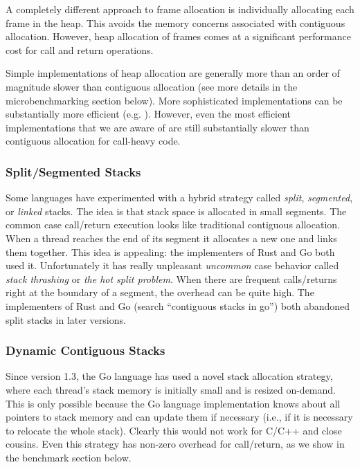 \documentclass[9pt,preprint]{sigplanconf}
\begin{document}
A completely different approach to frame allocation is individually allocating each frame in the heap.
This avoids the memory concerns associated with contiguous allocation.
However, heap allocation of frames comes at a significant performance cost for call and return operations.

Simple implementations of heap allocation are generally more than an order of magnitude slower than contiguous allocation (see more details in the microbenchmarking section below).
More sophisticated implementations can be substantially more efficient (e.g. \cite{Shao2000}).
However, even the most efficient implementations that we are aware of are still substantially slower than contiguous allocation for call-heavy code.

\subsubsection{Split/Segmented Stacks}

Some languages have experimented with a hybrid strategy called \emph{split}, \emph{segmented}, or \emph{linked} stacks.
The idea is that stack space is allocated in small segments.
The common case call/return execution looks like traditional contiguous allocation.
When a thread reaches the end of its segment it allocates a new one and links them together.
This idea is appealing: the implementers of Rust and Go both used it.
Unfortunately it has really unpleasant \emph{uncommon} case behavior called \emph{stack thrashing} or \emph{the hot split problem}.
When there are frequent calls/returns right at the boundary of a segment, the overhead can be quite high.
The implementers of Rust \cite{Anderson2013} and Go (search ``contiguous stacks in go'') both abandoned split stacks in later versions.


\subsubsection{Dynamic Contiguous Stacks}

Since version 1.3, the Go language has used a novel stack allocation strategy, where each thread's stack memory is initially small and is resized on-demand.
This is only possible because the Go language implementation knows about all pointers to stack memory and can update them if necessary (i.e., if it is necessary to relocate the whole stack).
Clearly this would not work for C/C++ and close cousins.
Even this strategy has non-zero overhead for call/return, as we show in the benchmark section below.
\end{document}
